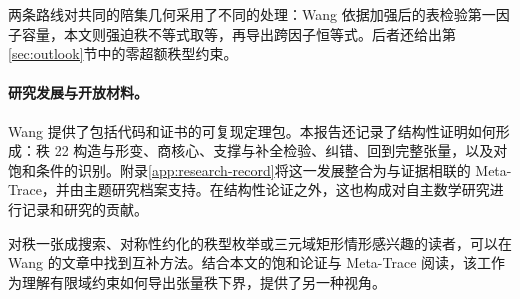 两条路线对共同的陪集几何采用了不同的处理：Wang 依据加强后的表检验第一因子容量，本文则强迫秩不等式取等，再导出跨因子恒等式。后者还给出第\ref{sec:outlook}节中的零超额秩型约束。

\paragraph{研究发展与开放材料。}
Wang 提供了包括代码和证书的可复现定理包。本报告还记录了结构性证明如何形成：秩 22 构造与形变、商核心、支撑与补全检验、纠错、回到完整张量，以及对饱和条件的识别。附录\ref{app:research-record}将这一发展整合为与证据相联的 Meta-Trace，并由主题研究档案支持。在结构性论证之外，这也构成对自主数学研究进行记录和研究的贡献。

对秩一张成搜索、对称性约化的秩型枚举或三元域矩形情形感兴趣的读者，可以在 Wang 的文章\cite{wang2026twentyone}中找到互补方法。结合本文的饱和论证与 Meta-Trace 阅读，该工作为理解有限域约束如何导出张量秩下界，提供了另一种视角。
